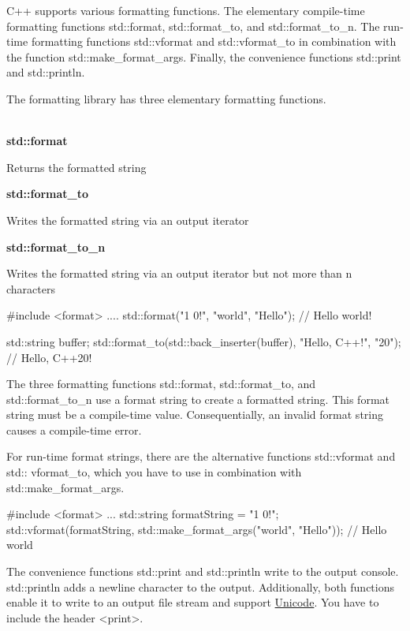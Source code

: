 C++ supports various formatting functions. The elementary compile-time formatting functions std::format, std::format\_to, and std::format\_to\_n. The run-time formatting functions std::vformat and std::vformat\_to in combination with the function std::make\_format\_args. Finally, the convenience functions std::print and std::println.

The formatting library has three elementary formatting functions.

\noindent
\\\textbf{std::format}

Returns the formatted string

\noindent
\textbf{std::format\_to}

Writes the formatted string via an output iterator

\noindent
\textbf{std::format\_to\_n}

Writes the formatted string via an output iterator but not more than n characters \\

\begin{cpp}
#include <format>
....
std::format("{1} {0}!", "world", "Hello"); // Hello world!

std::string buffer;
std::format_to(std::back_inserter(buffer),
	"Hello, C++{}!\n", "20"); // Hello, C++20!
\end{cpp}


The three formatting functions std::format, std::format\_to, and std::format\_to\_n use a format string to create a formatted string. This format string must be a compile-time value. Consequentially, an invalid format string causes a compile-time error.

For run-time format strings, there are the alternative functions std::vformat and std:: vformat\_to, which you have to use in combination with std::make\_format\_args.

\begin{cpp}
#include <format>
...
std::string formatString = "{1} {0}!";
std::vformat(formatString, std::make_format_args("world", "Hello")); // Hello world
\end{cpp}


The convenience functions std::print and std::println write to the output console. std::println adds a newline character to the output. Additionally, both functions enable it to write to an output file stream and support \href{https://en.wikipedia.org/wiki/Unicode}{Unicode}. You have to include the header <print>.

